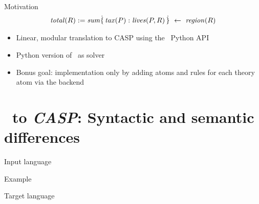 \documentclass[11pt]{beamer}
\begin{document}
\begin{frame}{Motivation}
\begin{align*}
  \mathit{total}(R) := \mathit{sum}\dot{\{} \, \mathit{tax}(P) : \mathit{lives}(P,R) \,  \dot{\}} \ \leftarrow \ \mathit{region}(R)
\end{align*}
\pause
\small
\quad
\pause
\begin{itemize}
  \item Linear, modular translation to CASP using the \clingo\ Python API
  \pause
  \item Python version of \clingcon\ as solver
  \pause
  \item Bonus goal: implementation only by adding atoms and rules for each theory atom via the backend
\end{itemize}
\end{frame}

\begin{frame}
\tableofcontents
\end{frame}

\section{\HTC\ to \emph{CASP}: Syntactic and semantic differences}

\begin{frame}{Input language}
\scriptsize
\end{frame}

\begin{frame}{Example}
\scriptsize
\end{frame}

\begin{frame}{Target language}
\scriptsize
\end{frame}
\end{document}
